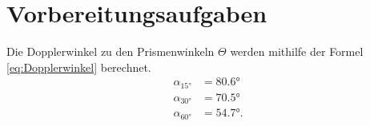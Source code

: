 \section{Vorbereitungsaufgaben}
\label{sec:Vorbereitung}

Die Dopplerwinkel zu den Prismenwinkeln $Θ$ werden mithilfe der Formel \eqref{eq:Dopplerwinkel} berechnet.\\
\begin{align*}
    α_{15°} &= 80.6°\\
    α_{30°} &= 70.5°\\
    α_{60°} &= 54.7°.
\end{align*}